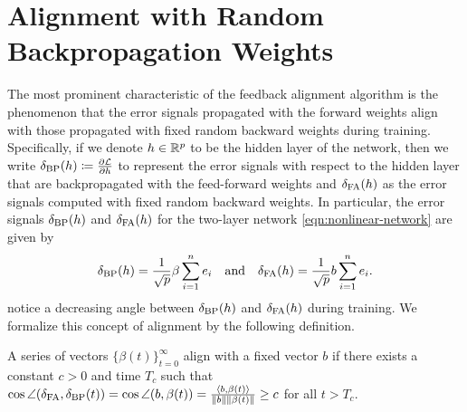 
\section{Alignment with Random Backpropagation Weights}\label{sec:alignment}

The most prominent characteristic of the feedback alignment algorithm is the phenomenon that the error signals propagated with the forward weights align with those propagated with fixed random backward weights during training. Specifically, if we denote $h\in \mathbb{R}^p$ to be the hidden layer of the network, then we write $\delta_\mathrm{BP}(h) \coloneqq \frac{\partial \mathcal{L}}{\partial h}$ to represent the error signals with respect to the hidden layer that are backpropagated with the feed-forward weights and $\delta_\mathrm{FA}(h)$ as the error signals computed with fixed random backward weights.
In particular, the error signals $\delta_\mathrm{BP}(h)$ and $\delta_\mathrm{FA}(h)$ for the two-layer network \eqref{eqn:nonlinear-network} are given by
\begin{equation}
    \delta_\mathrm{BP}(h) = \frac{1}{\sqrt{p}}\beta\sum_{i=1}^ne_i \quad\text{and}\quad \delta_\mathrm{FA}(h) = \frac{1}{\sqrt{p}}b\sum_{i=1}^ne_i.
\end{equation}
\citet{lillicrap2016random} notice a decreasing angle between $\delta_\mathrm{BP}(h)$ and $\delta_\mathrm{FA}(h)$ during training. We formalize this concept of alignment by the following definition.
\begin{definition}\label{def:alignment}
    A series of vectors $\{\beta(t)\}_{t=0}^\infty$ align with a fixed vector $b$ if there exists a constant $c>0$ and time $T_c$ such that  $\cos\angle(\delta_\mathrm{FA}, \delta_\mathrm{BP}(t)) = \cos\angle(b, \beta(t)) = \frac{\langle b, \beta(t)\rangle}{\|b\|\|\beta(t)\|} \geq c$ for all $t > T_c$.
\end{definition}

